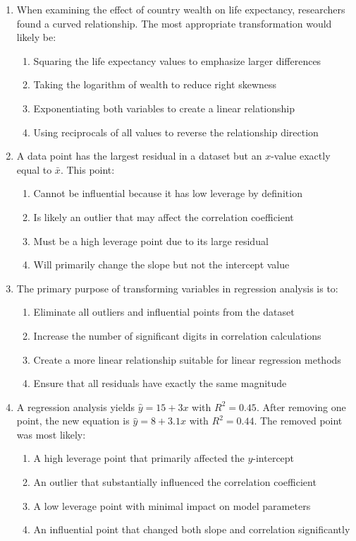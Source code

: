 \documentclass[11pt]{article}
\begin{document}
\begin{enumerate}
\item When examining the effect of country wealth on life expectancy, researchers found a curved relationship. The most appropriate transformation would likely be:
\begin{enumerate}[label=(\Alph*)]
\item Squaring the life expectancy values to emphasize larger differences
\item Taking the logarithm of wealth to reduce right skewness
\item Exponentiating both variables to create a linear relationship  
\item Using reciprocals of all values to reverse the relationship direction
\end{enumerate}

\item A data point has the largest residual in a dataset but an $x$-value exactly equal to $\bar{x}$. This point:
\begin{enumerate}[label=(\Alph*)]
\item Cannot be influential because it has low leverage by definition
\item Is likely an outlier that may affect the correlation coefficient
\item Must be a high leverage point due to its large residual
\item Will primarily change the slope but not the intercept value
\end{enumerate}

\item The primary purpose of transforming variables in regression analysis is to:
\begin{enumerate}[label=(\Alph*)]
\item Eliminate all outliers and influential points from the dataset
\item Increase the number of significant digits in correlation calculations
\item Create a more linear relationship suitable for linear regression methods
\item Ensure that all residuals have exactly the same magnitude
\end{enumerate}

\item A regression analysis yields $\hat{y} = 15 + 3x$ with $R^2 = 0.45$. After removing one point, the new equation is $\hat{y} = 8 + 3.1x$ with $R^2 = 0.44$. The removed point was most likely:
\begin{enumerate}[label=(\Alph*)]
\item A high leverage point that primarily affected the $y$-intercept
\item An outlier that substantially influenced the correlation coefficient
\item A low leverage point with minimal impact on model parameters
\item An influential point that changed both slope and correlation significantly
\end{enumerate}


\end{enumerate}
\end{document}

